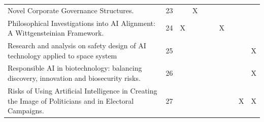 \begin{landscape}
\begin{longtable}{|p{14cm}|c|c|c|c|c|c|c|c|c|}
		Novel Corporate Governance Structures.                                                                                                                  & 23          &                                    & X                                                         &                                                       &                                                            &                                           &                                              &                                                    &                                    \\
		Philosophical Investigations into AI Alignment: A Wittgensteinian Framework.                                                                            & 24          & X                                  &                                                           &                                                       &                                                            & X                                         &                                              &                                                    &                                    \\
		Research and analysis on safety design of AI technology applied to space system                                                                         & 25          &                                    &                                                           &                                                       &                                                            &                                           &                                              &                                                    & X                                  \\
		Responsible AI in biotechnology: balancing discovery, innovation and biosecurity risks.                                                                 & 26          &                                    &                                                           &                                                       &                                                            &                                           &                                              &                                                    & X                                  \\
		Risks of Using Artificial Intelligence in Creating the Image of Politicians and in Electoral Campaigns.                                                 & 27          &                                    &                                                           &                                                       &                                                            &                                           &                                              & X                                                  & X                                  \\

\end{longtable}
\end{landscape}

